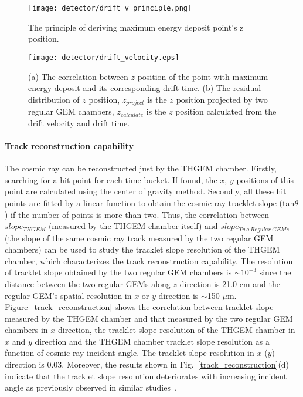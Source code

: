 \begin{figure}[htbp]
\begin{center}
\texttt{[image: detector/drift\_v\_principle.png]}
\vspace*{-3mm}
\caption{The principle of deriving maximum energy deposit point's z position.} \label{driftv_principle}
\end{center}
\end{figure}
\begin{figure}[htbp]
\begin{center}
\texttt{[image: detector/drift\_velocity.eps]}
\vspace*{-3mm}
\caption{(a) The correlation between $z$ position of the point with maximum energy deposit and its corresponding drift time. (b) The residual distribution of $z$ position, $z_{project}$ is the $z$ position projected by two regular GEM chambers, $z_{calculate}$ is the $z$ position calculated from the drift velocity and drift time.} \label{thgem_v}
\end{center}
\end{figure}

\paragraph{Track reconstruction capability} 
The cosmic ray can be reconstructed just by the THGEM chamber. Firstly, searching for a hit point for each time bucket. If found, the $x$, $y$ positions of this point are calculated using the center of gravity method. Secondly, all these hit points are fitted by a linear function to obtain the cosmic ray tracklet slope (tan$\theta$)  if the number of points is more than two. Thus, the correlation between $slope_{THGEM}$ (measured by the THGEM chamber itself) and $slope_{Two~Regular~GEMs}$ (the slope of the same cosmic ray track measured by the two regular GEM chambers) can be used to study the tracklet slope resolution of the THGEM chamber, which characterizes the track reconstruction capability. The resolution of tracklet slope obtained by the two regular GEM chambers is $\sim$$10^{-3}$ since the distance between the two regular GEMs along $z$ direction is 21.0 cm and the regular GEM's spatial resolution in $x$ or $y$ direction is $\sim$150 $\mu$m. Figure~\ref{track_reconstruction} shows the correlation between tracklet slope measured by the THGEM chamber and that measured by the two regular GEM chambers in $x$ direction, the tracklet slope resolution of the THGEM chamber in $x$ and $y$ direction and the THGEM chamber tracklet slope resolution as a function of cosmic ray incident angle. The tracklet slope resolution in $x$ ($y$) direction is 0.03. Moreover, the results shown in Fig.~\ref{track_reconstruction}(d) indicate that the tracklet slope resolution deteriorates with increasing incident angle as previously observed in similar studies~\cite{spatialResvsAngle}.

